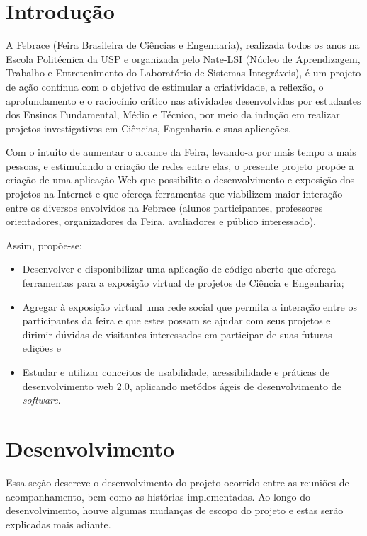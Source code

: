 \documentclass[a4paper,12pt,font=plain,header=plain]{abnt}
\begin{document}
	\chapter{Introdução}
	
	A Febrace (Feira Brasileira de Ciências e Engenharia), realizada todos os anos na Escola Politécnica da USP e organizada pelo Nate-LSI (Núcleo de Aprendizagem, Trabalho e Entretenimento do Laboratório de Sistemas Integráveis), é um projeto de ação contínua com o objetivo de estimular a criatividade, a reflexão, o aprofundamento e o raciocínio crítico nas atividades desenvolvidas por estudantes dos Ensinos Fundamental, Médio e Técnico, por meio da indução em realizar projetos investigativos em Ciências, Engenharia e suas aplicações.
	
	Com o intuito de aumentar o alcance da Feira, levando-a por mais tempo a mais pessoas, e estimulando a criação de redes entre elas, o presente projeto propõe a criação de uma aplicação Web que possibilite o desenvolvimento e exposição dos projetos na Internet e que ofereça ferramentas que viabilizem maior interação entre os diversos envolvidos na Febrace (alunos participantes, professores orientadores, organizadores da Feira, avaliadores e público interessado).
	
	Assim, propõe-se:
	
	\begin{itemize}
	\item{
		Desenvolver e disponibilizar uma aplicação de código aberto que ofereça ferramentas para a exposição virtual de projetos de Ciência e Engenharia;
	}
	\item{
		Agregar à exposição virtual uma rede social que permita a interação entre os participantes da feira e que estes possam se ajudar com seus projetos e dirimir dúvidas de visitantes interessados em participar de suas futuras edições e
	}
	\item{
		Estudar e utilizar conceitos de usabilidade, acessibilidade e práticas de desenvolvimento web 2.0, aplicando metódos ágeis de desenvolvimento de \textit{software}.
	}
	\end{itemize}

\chapter{Desenvolvimento}

  Essa seção descreve o desenvolvimento do projeto ocorrido entre as reuniões de acompanhamento, bem como as histórias implementadas. Ao longo do desenvolvimento, houve algumas mudanças de escopo do projeto e estas serão explicadas mais adiante.
\end{document}
